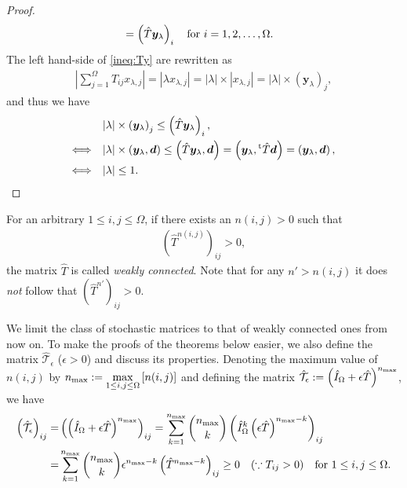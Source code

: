 \begin{proof}
\begin{align}
	&=\left(\hat{T}\bm{y}_{\lambda}\right)_{i}\quad\text{\text{for $i=1,2,\dots,\Omega$}}\label{ineq:Ty}.
	\end{align}
	The left hand-side of \eqref{ineq:Ty} are rewritten as
	\begin{align}
	\left|\sum_{j=1}^{\Omega}T_{ij}x_{\lambda,j}\right| = |\lambda x_{\lambda,j}| = |\lambda|\times |x_{\lambda,j}| = |\lambda|\times \left(\bm{y}_{\lambda}\right)_{j},
	\end{align}
	and thus we have
	\begin{align}
	& |\lambda|\times \left(\bm{y}_{\lambda}\right)_{j} \leq \left(\hat{T}\bm{y}_{\lambda}\right)_{i},\\
	\Longleftrightarrow \quad& |\lambda|\times \left(\bm{y}_{\lambda},\bm{d}\right) \leq \left(\hat{T}\bm{y}_{\lambda},\bm{d}\right) = \left(\bm{y}_{\lambda},{}^{\rm t}\hat{T}\bm{d}\right) = \left(\bm{y}_{\lambda},\bm{d}\right), \\
	\Longleftrightarrow \quad& |\lambda| \leq 1.
	\end{align}
\end{proof}

\begin{definition}
	For an arbitrary $1\leq i,j\leq \Omega$, if there exists an $n(i,j)>0$ such that
	\begin{align}
	\left(\hat{T}^{n(i,j)}\right)_{ij}>0,
	\end{align}
	the matrix $\hat{T}$ is called \textit{weakly connected}. Note that for any $n'>n(i,j)$ it does \textit{not} follow that $\left(\hat{T}^{n'}\right)_{ij}>0$.
\end{definition}

We limit the class of stochastic matrices to that of weakly connected ones from now on. To make the proofs of the theorems below easier, we also define the matrix $\hat{\mathcal{T}}_{\epsilon}$ ($\epsilon>0$) and discuss its properties. Denoting the maximum value of $n(i,j)$ by $\displaystyle n_{\rm max}:=\max_{1\leq i,j\leq \Omega}\left[n(i,j)\right]$ and defining the matrix $\hat{\mathcal{T}}_{\epsilon}:=\left(\hat{I}_{\Omega}+\epsilon \hat{T}\right)^{n_{\rm max}}$, we have
	\begin{align}
	\left(\hat{\mathcal{T}}_{\epsilon}\right)_{ij} =& \left(\left(\hat{I}_{\Omega}+\epsilon \hat{T}\right)^{n_{\rm max}}\right)_{ij} = \sum_{k=1}^{n_{\rm max}}\binom{n_{\rm max}}{k}\left({\hat{I}_{\Omega}}^{k}\left(\epsilon \hat{T}\right)^{n_{\rm max}-k}\right)_{ij}\\
	=& \sum_{k=1}^{n_{\rm max}}\binom{n_{\rm max}}{k}\epsilon^{n_{\rm max}-k}\left(\hat{T}^{n_{\rm max}-k}\right)_{ij} \geq 0 \quad(\because T_{ij}>0)\quad\text{for $1\leq i,j\leq \Omega$}.
	\end{align}

